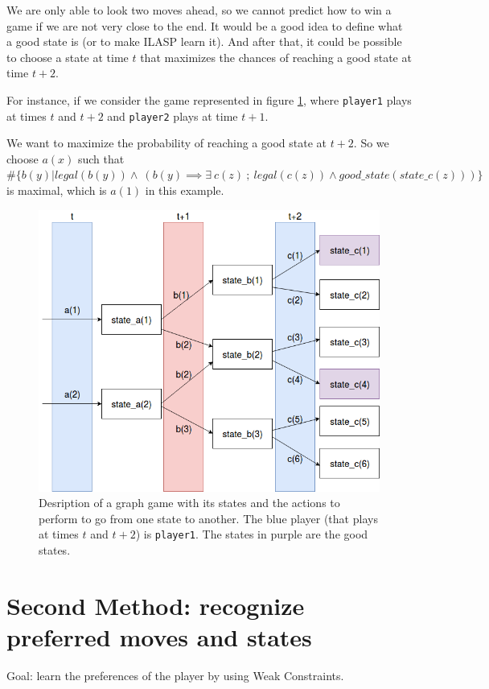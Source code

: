 \documentclass[12pt,twoside]{report}
\begin{document}
We are only able to look two moves ahead, so we cannot predict how to win a game if we are not very close to the end. It would be a good idea to define what a good state is (or to make ILASP learn it). And after that, it could be possible to choose a state at time $t$ that maximizes the chances of reaching a good state at time $t+2$.

\bigskip

For instance, if we consider the game represented in figure \ref{fig:graph_game}, where \texttt{player1} plays at times $t$ and $t+2$ and \texttt{player2} plays at time $t+1$. 

\smallskip

We want to maximize the probability of reaching a good state at $t+2$. So we choose $a(x)$ such that $\#\{b(y)|legal(b(y))\wedge\:\left( b(y) \implies \exists \:c(z) \:;\: legal(c(z)) \wedge good\_state(state\_c(z)) \right)\}$ is maximal, which is $a(1)$ in this example.

\begin{figure}[h]
\centering
\includegraphics[width = 0.8\hsize]{figures/graph_game.png}
\caption{Desription of a graph game with its states and the actions to perform to go from one state to another. The blue player (that plays at times $t$ and $t+2$) is \texttt{player1}. The states in purple are the good states.}
\label{fig:graph_game}
\end{figure}

\section{Second Method: recognize preferred moves and states}

Goal: learn the preferences of the player by using Weak Constraints.
\end{document}
